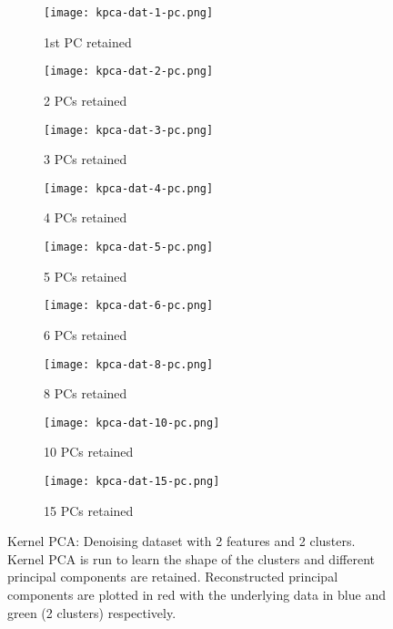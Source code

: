 \documentclass[paper=a4, fontsize=11pt]{scrartcl} %
\numberwithin{equation}{section} %
\begin{document}
\begin{figure}[H]
\centering
	\begin{subfigure}[b]{0.3\textwidth}
		\centering
		\texttt{[image: kpca-dat-1-pc.png]}
		\caption{1st PC retained}
	\end{subfigure}%
	\begin{subfigure}[b]{0.3\textwidth}
		\centering
		\texttt{[image: kpca-dat-2-pc.png]}
		\caption{2 PCs retained}
	\end{subfigure}%
	\begin{subfigure}[b]{0.3\textwidth}
		\centering
		\texttt{[image: kpca-dat-3-pc.png]}
		\caption{3 PCs retained}
	\end{subfigure}
	\begin{subfigure}[b]{0.3\textwidth}
		\centering
		\texttt{[image: kpca-dat-4-pc.png]}
		\caption{4 PCs retained}
	\end{subfigure}%
	\begin{subfigure}[b]{0.3\textwidth}
		\centering
		\texttt{[image: kpca-dat-5-pc.png]}
		\caption{5 PCs retained}
	\end{subfigure}%
	\begin{subfigure}[b]{0.3\textwidth}
		\centering
		\texttt{[image: kpca-dat-6-pc.png]}
		\caption{6 PCs retained}
	\end{subfigure}
		\begin{subfigure}[b]{0.3\textwidth}
		\centering
		\texttt{[image: kpca-dat-8-pc.png]}
		\caption{8 PCs retained}
	\end{subfigure}%
	\begin{subfigure}[b]{0.3\textwidth}
		\centering
		\texttt{[image: kpca-dat-10-pc.png]}
		\caption{10 PCs retained}
	\end{subfigure}%
	\begin{subfigure}[b]{0.3\textwidth}
		\centering
		\texttt{[image: kpca-dat-15-pc.png]}
		\caption{15 PCs retained}
	\end{subfigure}
\caption{Kernel PCA: Denoising dataset with 2 features and 2 clusters. Kernel PCA is run to learn the shape of the clusters and different principal components are retained. Reconstructed principal components are plotted in red with the underlying data in blue and green (2 clusters) respectively.}
\label{kpca-denoise}
\end{figure}
\end{document}

